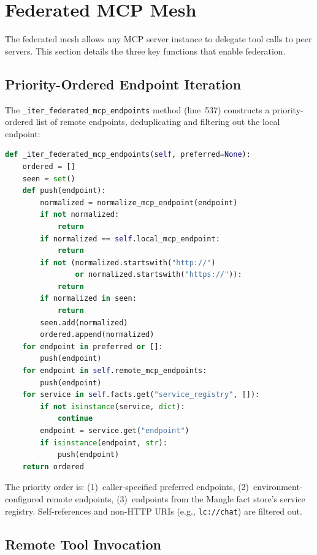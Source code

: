 \documentclass[11pt]{article}
\newcommand{\code}[1]{\texttt{#1}}
\begin{document}
\section{Federated MCP Mesh}
\label{sec:federated-mesh}

The federated mesh allows any MCP server instance to delegate tool calls
to peer servers.  This section details the three key functions that
enable federation.

\subsection{Priority-Ordered Endpoint Iteration}

The \code{\_iter\_federated\_mcp\_endpoints} method (line~537) constructs a
priority-ordered list of remote endpoints, deduplicating and filtering
out the local endpoint:

\begin{lstlisting}[language=Python,caption={Federated endpoint iteration (server.py lines 537--564)},label=lst:iter-federated]
def _iter_federated_mcp_endpoints(self, preferred=None):
    ordered = []
    seen = set()
    def push(endpoint):
        normalized = normalize_mcp_endpoint(endpoint)
        if not normalized:
            return
        if normalized == self.local_mcp_endpoint:
            return
        if not (normalized.startswith("http://")
                or normalized.startswith("https://")):
            return
        if normalized in seen:
            return
        seen.add(normalized)
        ordered.append(normalized)
    for endpoint in preferred or []:
        push(endpoint)
    for endpoint in self.remote_mcp_endpoints:
        push(endpoint)
    for service in self.facts.get("service_registry", []):
        if not isinstance(service, dict):
            continue
        endpoint = service.get("endpoint")
        if isinstance(endpoint, str):
            push(endpoint)
    return ordered
\end{lstlisting}

The priority order is: (1)~caller-specified preferred endpoints,
(2)~environment-configured remote endpoints, (3)~endpoints from the
Mangle fact store's service registry.  Self-references and non-HTTP
URIs (e.g., \code{lc://chat}) are filtered out.

\subsection{Remote Tool Invocation}
\end{document}
